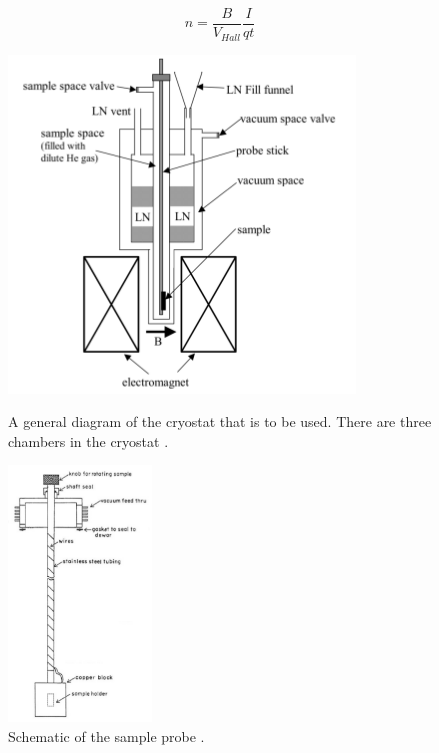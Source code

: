 \documentclass[twocolumn]{article}
\begin{document}
\begin{equation}
n = \frac{B}{V_{Hall}}\frac{I}{qt}
\label{eqn:15}
\end{equation}
\begin{figure}
\begin{minipage}[t]{0.46\textwidth}
\includegraphics[width=\linewidth]{cryostat.png}
\caption{A general diagram of the cryostat that is to be used. There are three 
chambers in the cryostat \cite{ref:3}.}
\label{fig:4}
\end{minipage}
\hfill
\begin{minipage}[t]{0.46\textwidth}
\includegraphics[width=1.5in]{sample-probe.png}
\caption{Schematic of the sample probe \cite{ref:3}.}
\label{fig:5}
\end{minipage}
\end{figure}
\end{document}
